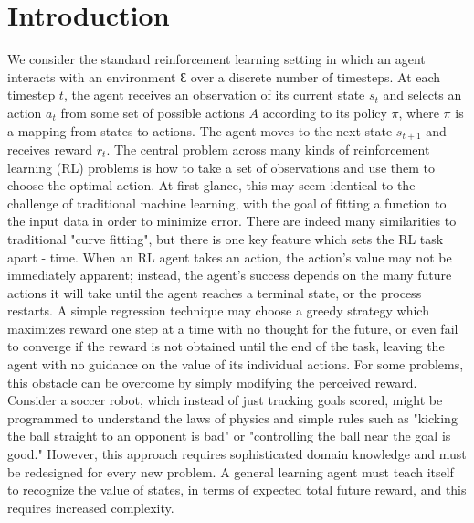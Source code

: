 \documentclass[journal,onecolumn]{IEEEtran}
\begin{document}
\section{Introduction}
% 
% 
% 
% 
We consider the standard reinforcement learning setting in which an agent interacts with an environment $Ɛ$ over a discrete number of timesteps. At each timestep $t$, the agent receives an observation of its current state $s_{t}$  and selects an action $a_{t}$  from some set of possible actions $A$ according to its policy $\pi$, where $\pi$ is a mapping from states to actions. The agent moves to the next state $s_{t+1}$ and receives reward $r_{t}$. The central problem across many kinds of reinforcement learning (RL) problems is how to take a set of observations and use them to choose the optimal action.  At first glance, this may seem identical to the challenge of traditional machine learning, with the goal of fitting a function to the input data in order to minimize error.  There are indeed many similarities to traditional "curve fitting", but there is one key feature which sets the RL task apart - time.  When an RL agent takes an action, the action's value may not be immediately apparent; instead, the agent's success depends on the many future actions it will take until the agent reaches a terminal state, or the process restarts.  A simple regression technique may choose a greedy strategy which maximizes reward one step at a time with no thought for the future, or even fail to converge if the reward is not obtained until the end of the task, leaving the agent with no guidance on the value of its individual actions.  For some problems, this obstacle can be overcome by simply modifying the perceived reward. Consider a soccer robot, which instead of just tracking goals scored, might be programmed to understand the laws of physics and simple rules such as "kicking the ball straight to an opponent is bad" or "controlling the ball near the goal is good."  However, this approach requires sophisticated domain knowledge and must be redesigned for every new problem.  A general learning agent must teach itself to recognize the value of states, in terms of expected total future reward, and this requires increased complexity.
\end{document}
